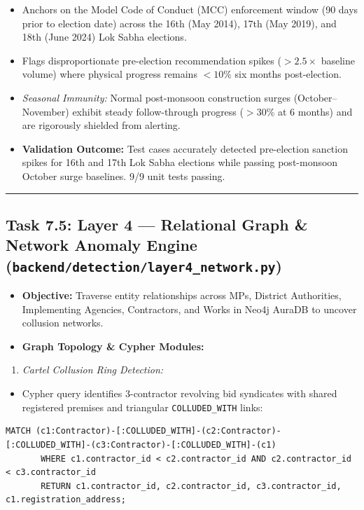 \documentclass[11pt,a4paper]{article}
\begin{document}
\begin{itemize}[leftmargin=1.5em, itemsep=2pt, topsep=3pt]
\item Anchors on the Model Code of Conduct (MCC) enforcement window (90 days prior to election date) across the 16th (May 2014), 17th (May 2019), and 18th (June 2024) Lok Sabha elections.
\item Flags disproportionate pre-election recommendation spikes ($> 2.5\times$ baseline volume) where physical progress remains $< 10\%$ six months post-election.
\item \textit{Seasonal Immunity:} Normal post-monsoon construction surges (October–November) exhibit steady follow-through progress ($> 30\%$ at 6 months) and are rigorously shielded from alerting.
\item \textbf{Validation Outcome:} Test cases accurately detected pre-election sanction spikes for 16th and 17th Lok Sabha elections while passing post-monsoon October surge baselines. 9/9 unit tests passing.
\end{itemize}

\vspace{1em}\hrule\vspace{1em}

\subsection{Task 7.5: Layer 4 --- Relational Graph \& Network Anomaly Engine (\texttt{backend/detection/layer4\_network.py})}
\begin{itemize}[leftmargin=1.5em, itemsep=2pt, topsep=3pt]
\item \textbf{Objective:} Traverse entity relationships across MPs, District Authorities, Implementing Agencies, Contractors, and Works in Neo4j AuraDB to uncover collusion networks.
\item \textbf{Graph Topology \& Cypher Modules:}
\end{itemize}
\begin{enumerate}[leftmargin=1.5em, itemsep=2pt, topsep=3pt]
\item \textit{Cartel Collusion Ring Detection:}
\end{enumerate}
\begin{itemize}[leftmargin=1.5em, itemsep=2pt, topsep=3pt]
\item Cypher query identifies 3-contractor revolving bid syndicates with shared registered premises and triangular \texttt{COLLUDED\_WITH} links:
\end{itemize}
\begin{tcolorbox}[colback=gray!5!white,colframe=gray!60!black,arc=1mm,boxrule=0.6pt,left=6pt,right=6pt,top=6pt,bottom=6pt]
\begin{lstlisting}[basicstyle=\ttfamily\scriptsize,breaklines=true,columns=flexible]
       MATCH (c1:Contractor)-[:COLLUDED_WITH]-(c2:Contractor)-[:COLLUDED_WITH]-(c3:Contractor)-[:COLLUDED_WITH]-(c1)
       WHERE c1.contractor_id < c2.contractor_id AND c2.contractor_id < c3.contractor_id
       RETURN c1.contractor_id, c2.contractor_id, c3.contractor_id, c1.registration_address;
\end{lstlisting}
\end{tcolorbox}
\end{document}
